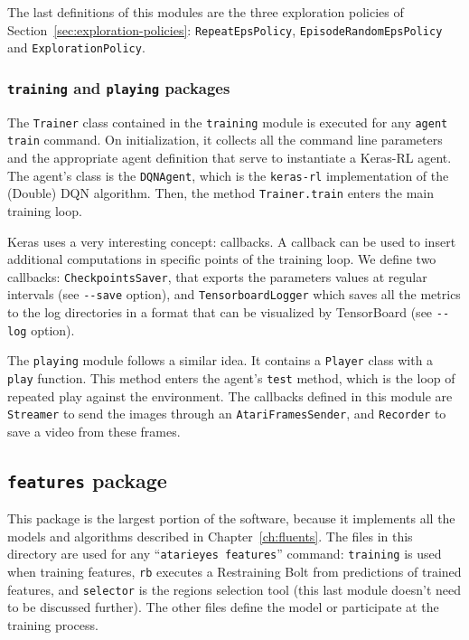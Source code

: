 The last definitions of this modules are the three exploration policies of
Section~\ref{sec:exploration-policies}: \texttt{RepeatEpsPolicy},
\texttt{EpisodeRandomEpsPolicy} and \texttt{ExplorationPolicy}.


\subsubsection*{\texttt{training} and \texttt{playing} packages}

The \texttt{Trainer} class contained in the \texttt{training} module is
executed for any \lstinline[style=inlinepy]|agent train| command. On
initialization, it collects all the command line parameters and the
appropriate agent definition that serve to instantiate a Keras-RL agent. The
agent's class is the \texttt{DQNAgent}, which is the \texttt{keras-rl}
implementation of the (Double) DQN algorithm. Then, the method
\verb|Trainer.train| enters the main training loop.

Keras uses a very interesting concept: callbacks. A callback can be used to
insert additional computations in specific points of the training loop.  We
define two callbacks: \texttt{CheckpointsSaver}, that exports the parameters
values at regular intervals (see \verb|--save| option), and
\texttt{TensorboardLogger} which saves all the metrics to the log directories
in a format that can be visualized by TensorBoard (see \verb|--log| option).

The \texttt{playing} module follows a similar idea. It contains a
\texttt{Player} class with a \texttt{play} function. This method enters the
agent's \texttt{test} method, which is the loop of repeated play against the
environment. The callbacks defined in this module are \texttt{Streamer} to
send the images through an \texttt{AtariFramesSender}, and \texttt{Recorder}
to save a video from these frames.


\subsection{\texttt{features} package}

This package is the largest portion of the software, because it implements all
the models and algorithms described in Chapter~\ref{ch:fluents}. The files in
this directory are used for any
``\lstinline[style=inlinesh]|atarieyes features|'' command: \texttt{training}
is used when training features, \texttt{rb} executes a Restraining Bolt from
predictions of trained features, and \texttt{selector} is the regions
selection tool (this last module doesn't need to be discussed further).
The other files define the model or participate at the training process.


